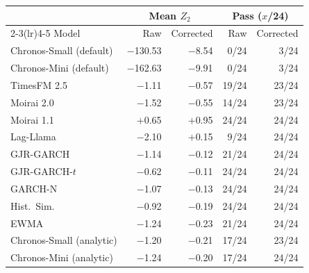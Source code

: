 \begin{tabular}{@{}l rr rr@{}}
\toprule
& \multicolumn{2}{c}{Mean $Z_2$}
& \multicolumn{2}{c}{Pass ($x$/24)} \\
\cmidrule(lr){2-3}\cmidrule(lr){4-5}
Model & Raw & Corrected & Raw & Corrected \\
\midrule
Chronos-Small (default) & $-$130.53 & $-$8.54 & 0/24 & 3/24 \\
Chronos-Mini (default) & $-$162.63 & $-$9.91 & 0/24 & 3/24 \\
TimesFM 2.5 & $-$1.11 & $-$0.57 & 19/24 & 23/24 \\
Moirai 2.0 & $-$1.52 & $-$0.55 & 14/24 & 23/24 \\
Moirai 1.1 & $+$0.65 & $+$0.95 & 24/24 & 24/24 \\
\midrule
Lag-Llama & $-$2.10 & $+$0.15 & 9/24 & 24/24 \\
GJR-GARCH & $-$1.14 & $-$0.12 & 21/24 & 24/24 \\
GJR-GARCH-$t$ & $-$0.62 & $-$0.11 & 24/24 & 24/24 \\
GARCH-N & $-$1.07 & $-$0.13 & 24/24 & 24/24 \\
Hist.\ Sim. & $-$0.92 & $-$0.19 & 24/24 & 24/24 \\
EWMA & $-$1.24 & $-$0.23 & 21/24 & 24/24 \\
Chronos-Small (analytic) & $-$1.20 & $-$0.21 & 17/24 & 23/24 \\
Chronos-Mini (analytic) & $-$1.24 & $-$0.20 & 17/24 & 24/24 \\
\bottomrule
\end{tabular}
